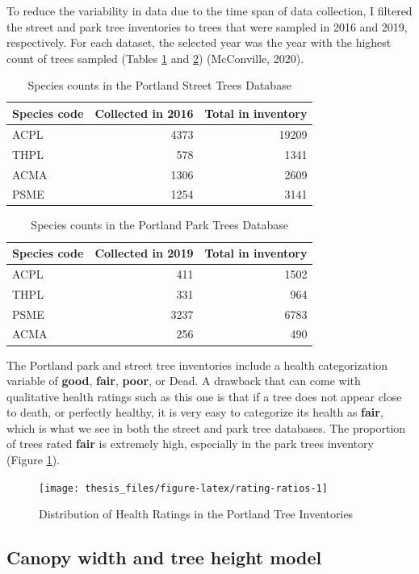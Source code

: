 \documentclass[12pt,twoside]{reedthesis}
\begin{document}
To reduce the variability in data due to the time span of data
collection, I filtered the street and park tree inventories to trees
that were sampled in 2016 and 2019, respectively. For each dataset, the
selected year was the year with the highest count of trees sampled
(Tables \ref{tab:streettable} and \ref{tab:parktable}) (McConville, 2020).
\begin{table}

\caption[Species counts in Street Trees Database]{\label{tab:streettable}Species counts in the Portland Street Trees Database}
\centering
\begin{tabular}[t]{lrr}
\toprule
Species code & Collected in 2016 & Total in inventory\\
\midrule
ACPL & 4373 & 19209\\
THPL & 578 & 1341\\
ACMA & 1306 & 2609\\
PSME & 1254 & 3141\\
\bottomrule
\end{tabular}
\end{table}
\begin{table}

\caption[Species counts in Park Trees Database]{\label{tab:parktable}Species counts in the Portland Park Trees Database}
\centering
\begin{tabular}[t]{lrr}
\toprule
Species code & Collected in 2019 & Total in inventory\\
\midrule
ACPL & 411 & 1502\\
THPL & 331 & 964\\
PSME & 3237 & 6783\\
ACMA & 256 & 490\\
\bottomrule
\end{tabular}
\end{table}
The Portland park and street tree inventories include a health
categorization variable of \textbf{good}, \textbf{fair}, \textbf{poor}, or Dead. A
drawback that can come with qualitative health ratings such as this one
is that if a tree does not appear close to death, or perfectly healthy,
it is very easy to categorize its health as \textbf{fair}, which is what we
see in both the street and park tree databases. The proportion of trees
rated \textbf{fair} is extremely high, especially in the park trees inventory
(Figure \ref{fig:rating-ratios}).
\begin{figure}

{\centering \texttt{[image: thesis\_files/figure-latex/rating-ratios-1]} 

}

\caption{Distribution of Health Ratings in the Portland Tree Inventories}\label{fig:rating-ratios}
\end{figure}
\hypertarget{canopy-width-and-tree-height-model}{%
\subsection{Canopy width and tree height model}\label{canopy-width-and-tree-height-model}}
\end{document}
